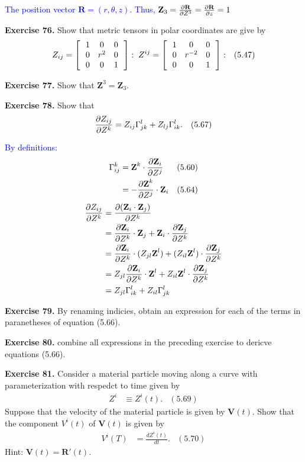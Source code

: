 \documentclass[12pt,a4paper]{report}
\newcommand{\BLUE}[1]{\textcolor{blue}{#1}}
\newcommand{\COFF}[3]{\Gamma^{#1}_{{#2}{#3}}}
\newcommand{\VK}[1]{\textbf{#1}}
\begin{document}
\begin{description}
\BLUE{The position vector $\VK{R}=(r, \theta, z)$.  Thus, $\VK{Z}_3=\PART{\VK{R}}{Z^3} = \PART{\VK{R}}{z} = 1$
}

\item \textbf{Exercise 76.}  Show that metric tensors in polar coordinates are give by 
\begin{align*}
	Z_{ij} &= \left [\,  \begin{array}{c c c} 1&0&0 \\ 0 & r^2 & 0 \\ 0 & 0 & 1 \end{array}  \,\right ]:\; Z^{ij} = \left [\,  \begin{array}{c c c} 1&0&0 \\ 0 & r^{-2} & 0 \\ 0 & 0 & 1 \end{array}  \,\right ]: & (5.47)
\end{align*}

\item \textbf{Exercise 77.}  Show that $\VK{Z}^3=\VK{Z}_3$.

\item \textbf{Exercise 78.}  Show that 
\begin{align*}
	\PART{Z_{ij}}{Z^k} &= Z_{ij}\COFF{l}{j}{k}+Z_{lj}\COFF{l}{i}{k}. & (5.67)
\end{align*}
	
	\BLUE{	By definitions:
	\begin{align*}
		\COFF{k}{i}{j} &= \VK{Z}^k\cdot \PART{\VK{Z}_i}{Z^j} & (5.60)\\
		&= -\PART{\VK{Z}^k}{Z^j}\cdot\VK{Z}_i & (5.64)
	\end{align*}
	\begin{align*}
		\PART{Z_{ij}}{Z^k} &= \PART{(\VK{Z}_i\cdot\VK{Z}_j)}{Z^k} \\
		&= \PART{\VK{Z}_i}{Z^k}\cdot \VK{Z}_j + \VK{Z}_i\cdot \PART{\VK{Z}_j}{Z^k} \\
		&= \PART{\VK{Z}_i}{Z^k}\cdot (Z_{jl}\VK{Z}^l) + (Z_{il}\VK{Z}^l)\cdot \PART{\VK{Z}_j}{Z^k} \\
		&= Z_{jl}\PART{\VK{Z}_i}{Z^k}\cdot \VK{Z}^l + Z_{il}\VK{Z}^l\cdot \PART{\VK{Z}_j}{Z^k} \\
		&= Z_{jl}\COFF{l}{i}{k}+Z_{il}\COFF{l}{j}{k}
\end{align*}	
	}

\item \textbf{Exercise 79.}  By renaming indicies, obtain an expression for each of the terms in paranetheses of equation (5.66).

\item \textbf{Exercise 80.} combine all expressions in the preceding exercise to dericve equations (5.66).

\item \textbf{Exercise 81.} Consider a material particle moving along a curve with parameterization with respedct to time given by 
\begin{align*}
	Z^i &\equiv Z^i(t).& (5.69)
\end{align*}Suppose that the velocity of the material particle is given by $\VK{V}(t)$.  Show that the component $V^i(t)$ of $\VK{V}(t)$ is given by 
\begin{align*}
	V^i(T) &= \frac{dZ^i(t)}{dt}. & (5.70)
\end{align*}Hint: $\VK{V}(t) =  \VK{R}'(t)$.


\end{description}
\end{document}
